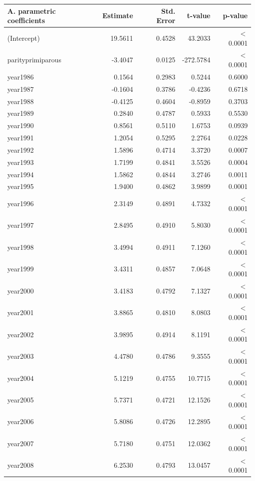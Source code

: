     \begin{table}[H]
    \centering
    \begin{tabular}{lrrrr}
    \textbf{A. parametric coefficients} & Estimate & Std. Error & t-value & p-value \\ 
       \hline
       \hline
  (Intercept) & 19.5611 & 0.4528 & 43.2033 & $<$ 0.0001 \\ 
  parityprimiparous & -3.4047 & 0.0125 & -272.5784 & $<$ 0.0001 \\ 
  year1986 & 0.1564 & 0.2983 & 0.5244 & 0.6000 \\ 
  year1987 & -0.1604 & 0.3786 & -0.4236 & 0.6718 \\ 
  year1988 & -0.4125 & 0.4604 & -0.8959 & 0.3703 \\ 
  year1989 & 0.2840 & 0.4787 & 0.5933 & 0.5530 \\ 
  year1990 & 0.8561 & 0.5110 & 1.6753 & 0.0939 \\ 
  year1991 & 1.2054 & 0.5295 & 2.2764 & 0.0228 \\ 
  year1992 & 1.5896 & 0.4714 & 3.3720 & 0.0007 \\ 
  year1993 & 1.7199 & 0.4841 & 3.5526 & 0.0004 \\ 
  year1994 & 1.5862 & 0.4844 & 3.2746 & 0.0011 \\ 
  year1995 & 1.9400 & 0.4862 & 3.9899 & 0.0001 \\ 
  year1996 & 2.3149 & 0.4891 & 4.7332 & $<$ 0.0001 \\ 
  year1997 & 2.8495 & 0.4910 & 5.8030 & $<$ 0.0001 \\ 
  year1998 & 3.4994 & 0.4911 & 7.1260 & $<$ 0.0001 \\ 
  year1999 & 3.4311 & 0.4857 & 7.0648 & $<$ 0.0001 \\ 
  year2000 & 3.4183 & 0.4792 & 7.1327 & $<$ 0.0001 \\ 
  year2001 & 3.8865 & 0.4810 & 8.0803 & $<$ 0.0001 \\ 
  year2002 & 3.9895 & 0.4914 & 8.1191 & $<$ 0.0001 \\ 
  year2003 & 4.4780 & 0.4786 & 9.3555 & $<$ 0.0001 \\ 
  year2004 & 5.1219 & 0.4755 & 10.7715 & $<$ 0.0001 \\ 
  year2005 & 5.7371 & 0.4721 & 12.1526 & $<$ 0.0001 \\ 
  year2006 & 5.8086 & 0.4726 & 12.2895 & $<$ 0.0001 \\ 
  year2007 & 5.7180 & 0.4751 & 12.0362 & $<$ 0.0001 \\ 
  year2008 & 6.2530 & 0.4793 & 13.0457 & $<$ 0.0001 \\ 

\end{tabular}
\end{table}
